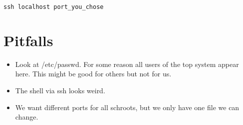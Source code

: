 \documentclass[a4paper]{article}
\begin{document}
\begin{verbatim}
ssh localhost port_you_chose
\end{verbatim}

\section{Pitfalls}
\begin{itemize}
\item Look at /etc/passwd. For some reason all users of the top system appear here. This might be good for others but not for us.
\item The shell via ssh looks weird.
\item We want different ports for all schroots, but we only have one file we can change.
\end{itemize}
\end{document}
